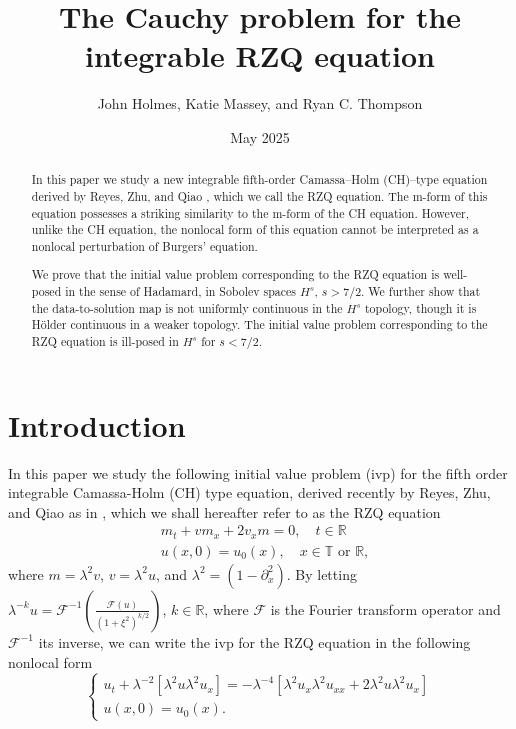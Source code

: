 \documentclass[reqno]{amsart}
\title{The Cauchy problem for the integrable RZQ equation}
\author{John Holmes, Katie Massey, and Ryan C. Thompson}
\date{May 2025}
\theoremstyle{plain}
\numberwithin{equation}{section}
\begin{document}
\begin{abstract}
    In this paper we study a new integrable fifth-order Camassa–Holm (CH)–type equation derived by Reyes, Zhu, and Qiao \cite{rzq}, which we call the RZQ equation. The m-form of this equation possesses a striking similarity to the m-form of the CH equation. However, unlike the CH equation, the nonlocal form of this equation cannot be interpreted as a nonlocal perturbation of Burgers' equation. 

    We prove that the initial value problem corresponding to the RZQ equation is well-posed in the sense of Hadamard, in Sobolev spaces $H^s$, $s>7/2$. We further show that the data-to-solution map is not uniformly continuous in the $H^s$ topology, though it is H\"older continuous in a weaker topology.  The initial value problem corresponding to the RZQ equation is ill-posed in $H^s$ for $s<7/2$.
\end{abstract} 
\maketitle

\section{Introduction}
  In this paper we study the following initial value problem (ivp) for the fifth order integrable  Camassa-Holm (CH) type equation, derived recently by Reyes, Zhu, and Qiao \cite{rzq} as in   \cite{qr}, which we shall hereafter refer to as the RZQ equation
\begin{align}\label{qrequation}
&m_t+vm_x+2v_xm=0, \quad t\in \mathbb R\\
&u(x,0)=u_0(x), \quad x\in \mathbb T \text{ or } \mathbb R, 
\end{align}  
where $m = \lambda ^2v $, $v = \lambda ^2u $, and $\lambda ^2= (1-\partial_x^2) $.  
By letting 
$\displaystyle \lambda^{-k} u  = \mathcal{F}^{-1}\left( \frac{\mathcal{F}(u)}{(1+\xi^2)^{k/2}}\right)$, $k \in \mathbb R$, where $\mathcal{F}$ is the Fourier transform operator and $\mathcal{F}^{-1}$ its inverse, we can write the ivp for the RZQ equation in the following nonlocal form
\begin{equation}\label{QR-nl}  
\begin{cases}
  u_t  + \lambda^{-2} [ \lambda^2 u \lambda ^2u_x ] 
  = 
  - \lambda^{-4} [   \lambda^2 u_x \lambda ^2u_{xx}  + 2 
 \lambda ^2  u \lambda^2 u_x   ]   
 \\
 u(x,0) = u_0(x).
 \end{cases}
\end{equation}
\end{document}
